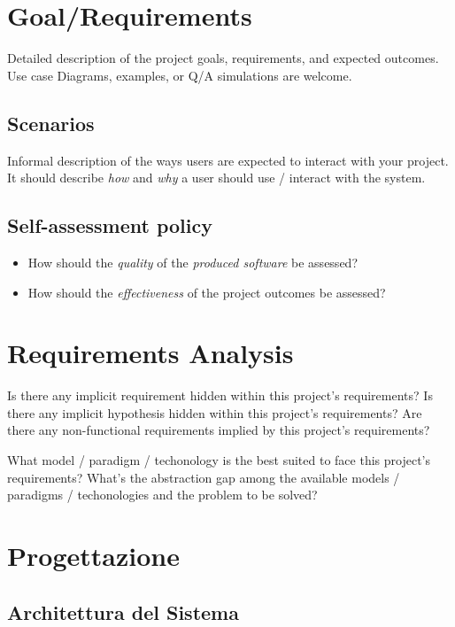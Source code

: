 \documentclass{scrartcl}
\begin{document}
\section{Goal/Requirements}

Detailed description of the project goals, requirements, and expected outcomes.
%
Use case Diagrams, examples, or Q/A simulations are welcome.

\subsection{Scenarios}

Informal description of the ways users are expected to interact with your project.
%
It should describe \emph{how} and \emph{why} a user should use / interact with the system.

\subsection{Self-assessment policy}

\begin{itemize}
    \item How should the \emph{quality} of the \emph{produced software} be assessed?

    \item How should the \emph{effectiveness} of the project outcomes be assessed?
\end{itemize}

\section{Requirements Analysis}

Is there any implicit requirement hidden within this project's requirements?
%
Is there any implicit hypothesis hidden within this project's requirements?
%
Are there any non-functional requirements implied by this project's requirements?

What model / paradigm / techonology is the best suited to face this project's requirements?
%
What's the abstraction gap among the available models / paradigms / techonologies and the problem to be solved?

\section{Progettazione}

\subsection{Architettura del Sistema}
\end{document}
